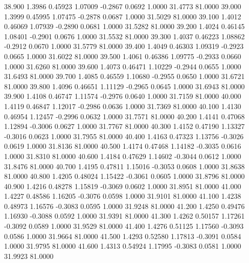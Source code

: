   38.900   1.3986   0.45923   1.07009  -0.2867   0.0692   1.0000  31.4773  81.0000
  39.000   1.3999   0.45995   1.07475  -0.2878   0.0687   1.0000  31.5029  81.0000
  39.100   1.4012   0.46069   1.07939  -0.2890   0.0681   1.0000  31.5282  81.0000
  39.200   1.4024   0.46145   1.08401  -0.2901   0.0676   1.0000  31.5532  81.0000
  39.300   1.4037   0.46223   1.08862  -0.2912   0.0670   1.0000  31.5779  81.0000
  39.400   1.4049   0.46303   1.09319  -0.2923   0.0665   1.0000  31.6022  81.0000
  39.500   1.4061   0.46386   1.09775  -0.2933   0.0660   1.0000  31.6260  81.0000
  39.600   1.4073   0.46471   1.10229  -0.2944   0.0655   1.0000  31.6493  81.0000
  39.700   1.4085   0.46559   1.10680  -0.2955   0.0650   1.0000  31.6721  81.0000
  39.800   1.4096   0.46651   1.11129  -0.2965   0.0645   1.0000  31.6943  81.0000
  39.900   1.4108   0.46747   1.11574  -0.2976   0.0640   1.0000  31.7159  81.0000
  40.000   1.4119   0.46847   1.12017  -0.2986   0.0636   1.0000  31.7369  81.0000
  40.100   1.4130   0.46954   1.12457  -0.2996   0.0632   1.0000  31.7571  81.0000
  40.200   1.4141   0.47068   1.12894  -0.3006   0.0627   1.0000  31.7767  81.0000
  40.300   1.4152   0.47190   1.13327  -0.3016   0.0623   1.0000  31.7955  81.0000
  40.400   1.4163   0.47323   1.13756  -0.3026   0.0619   1.0000  31.8136  81.0000
  40.500   1.4174   0.47468   1.14182  -0.3035   0.0616   1.0000  31.8310  81.0000
  40.600   1.4184   0.47629   1.14602  -0.3044   0.0612   1.0000  31.8476  81.0000
  40.700   1.4195   0.47811   1.15016  -0.3053   0.0608   1.0000  31.8638  81.0000
  40.800   1.4205   0.48024   1.15422  -0.3061   0.0605   1.0000  31.8796  81.0000
  40.900   1.4216   0.48278   1.15819  -0.3069   0.0602   1.0000  31.8951  81.0000
  41.000   1.4227   0.48586   1.16205  -0.3076   0.0598   1.0000  31.9101  81.0000
  41.100   1.4238   0.48973   1.16576  -0.3083   0.0595   1.0000  31.9248  81.0000
  41.200   1.4250   0.49476   1.16930  -0.3088   0.0592   1.0000  31.9391  81.0000
  41.300   1.4262   0.50157   1.17261  -0.3092   0.0589   1.0000  31.9529  81.0000
  41.400   1.4276   0.51125   1.17560  -0.3093   0.0586   1.0000  31.9664  81.0000
  41.500   1.4293   0.52580   1.17813  -0.3091   0.0584   1.0000  31.9795  81.0000
  41.600   1.4313   0.54924   1.17995  -0.3083   0.0581   1.0000  31.9923  81.0000
